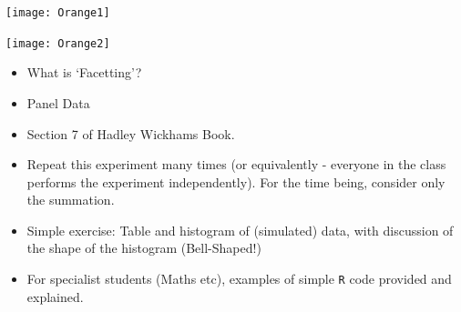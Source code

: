 \begin{frame}{\bf {}}
\vspace{-1cm}
\begin{center}
\texttt{[image: Orange1]}
\end{center}
\end{frame}

\begin{frame}{\bf {}}
\vspace{-1cm}
\begin{center}
\texttt{[image: Orange2]}
\end{center}
\end{frame}


\begin{frame}{\bf {}}
\begin{itemize}\itemsep0.7cm
\item What is `Facetting'?
\item Panel Data
\item Section 7 of Hadley Wickhams Book.

\end{itemize}
\end{frame}











\begin{frame}{\bf {}}
\begin{itemize}\itemsep0.3cm
\item Repeat this experiment many times (or equivalently - everyone in the class performs the experiment independently). For the time being, consider only the summation.
\item Simple exercise: Table and histogram of (simulated) data, with discussion of the shape of the histogram (Bell-Shaped!)
\item For specialist students (Maths etc), examples of simple \texttt{R} code provided and explained.

\end{itemize}
\end{frame}


